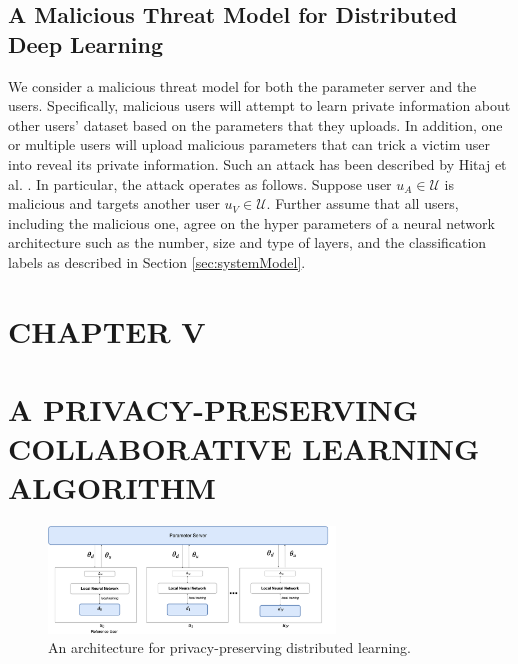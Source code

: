 \documentclass[letterpaper]{article}
\begin{document}
\begin{flushleft}
{%
\subsection{A Malicious Threat Model for Distributed Deep Learning}\label{sec:threatModel}

We consider a malicious threat model for both the parameter server and the users. Specifically, malicious users will
attempt to learn private information about other users' dataset based on the parameters that they uploads.  In
addition, one or multiple  users will upload malicious parameters that can trick a victim user into reveal its private information. 
Such an attack has been described by Hitaj et al. \cite{hitaj2017deep}. In particular, the attack operates as follows. 
Suppose user $u_A\in\mathcal{U}$ is malicious and targets another user $u_V\in\mathcal{U}$. Further assume that all users, including
the malicious one, agree on the hyper parameters of a neural network architecture such as the number, size and type of layers,  and the
classification labels as described in Section \ref{sec:systemModel}.


\pagebreak
\section*{CHAPTER V}
\vspace{0.25in}
\section{A PRIVACY-PRESERVING COLLABORATIVE LEARNING ALGORITHM}



\begin{figure}[H]
  \centering
    \includegraphics[width=3in]{HighLevelArch.png}
    \caption[A privacy preserving architecture.]{\label{fig:HighLevel} An architecture for privacy-preserving distributed learning.}
  \end{figure}



}
\end{flushleft}
\end{document}
